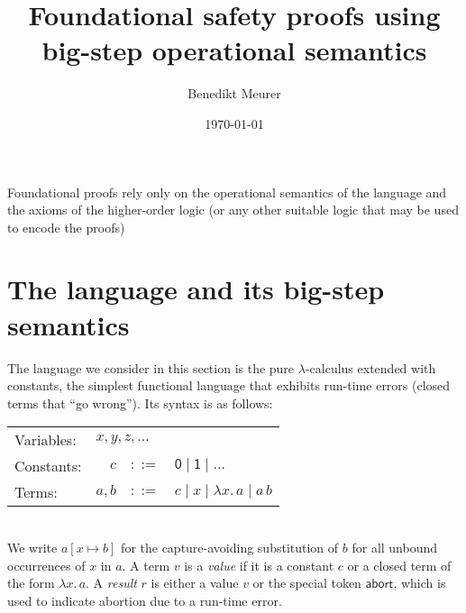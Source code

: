 \documentclass[12pt,a4paper]{article}
\theoremstyle{definition}
\theoremstyle{plain}
\newcommand{\abort}{\ensuremath{\mathsf{abort}}}
\newcommand{\abstr}[2]{\ensuremath{\lambda{#1}.\,{#2}}}
\newcommand{\app}[2]{\ensuremath{{#1}\,{#2}}}
\begin{document}
\author{Benedikt Meurer}
\date{\today}
\title{Foundational safety proofs using\\big-step operational semantics}
\maketitle


Foundational proofs rely only on the operational semantics of the language and the axioms of
the higher-order logic (or any other suitable logic that may be used to encode the proofs)


\section{The language and its big-step semantics}
\label{sec:The_language_and_its_big_step_semantics}

The language we consider in this section is the pure $\lambda$-calculus extended with constants,
the simplest functional language that exhibits run-time errors (closed terms that ``go wrong'').
Its syntax is as follows: \\[3mm]
\begin{tabular}{lrcl}
  Variables: & \multicolumn{3}{l}{$x,y,z,\ldots$} \\
  Constants: & $c$ & $::=$ & $\mathsf{0} \mid \mathsf{1} \mid \ldots$ \\
  Terms: & $a,b$ & $::=$ & $c \mid x \mid \abstr{x}{a} \mid \app{a}{b}$ \\
\end{tabular} \\[3mm]
We write $a[x \mapsto b]$ for the capture-avoiding substitution of $b$ for all unbound occurrences
of $x$ in $a$. A term $v$ is a \emph{value} if it is a constant $c$ or a closed term of the form
$\abstr{x}{a}$. A \emph{result} $r$ is either a value $v$ or the special token $\abort$, which is
used to indicate abortion due to a run-time error.
\end{document}
